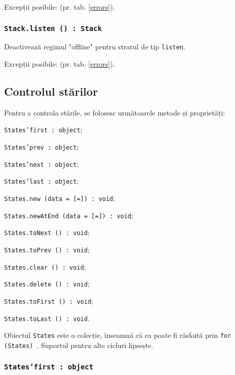 Excepții posibile:  (pr. tab. \ref{errors}).

\subsubsection{\texttt{Stack.listen () : Stack}}

Deactivează regimul "offline" pentru stratul de tip \texttt{listen}.

Excepții posibile:  (pr. tab. \ref{errors}).

\subsection{Controlul stărilor}

Pentru a controla stările, se folosesc următoarele metode și proprietăți:
\begin{icItems}
	\item \texttt{States'first : object};
	\item \texttt{States'prev : object};
	\item \texttt{States'next : object};
	\item \texttt{States'last : object};
	\item \texttt{States.new (data = [=]) : void};
	\item \texttt{States.newAtEnd (data = [=]) : void};
	\item \texttt{States.toNext () : void};
	\item \texttt{States.toPrev () : void};
	\item \texttt{States.clear () : void};
	\item \texttt{States.delete () : void};
	\item \texttt{States.toFirst () : void};
	\item \texttt{States.toLast () : void}.
\end{icItems}

Obiectul \texttt{States} este o colecție, înseamnă că ea poate fi răsfoită prin \texttt{for (States) {}}. Suportul pentru alte cicluri lipsește.

\subsubsection{\texttt{States'first : object}}

